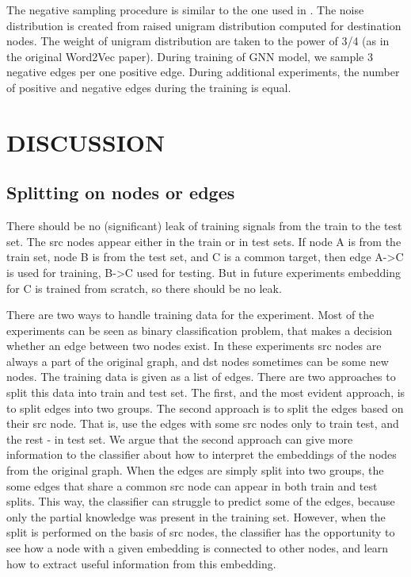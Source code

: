 \documentclass[a4paper,twoside]{article}
\begin{document}
The negative sampling procedure is similar to the one used in \cite{mikolov2013distributed}. The noise distribution is created from raised unigram distribution computed for destination nodes. The weight of unigram distribution are taken to the power of 3/4 (as in the original Word2Vec paper). During training of GNN model, we sample 3 negative edges per one positive edge. During additional experiments, the number of positive and negative edges during the training is equal.


\section{\uppercase{Discussion}}

\subsection{Splitting on nodes or edges}

There should be no (significant) leak of training signals from the train to the test set. The src nodes appear either in the train or in test sets. If node A is from the train set, node B is from the test set, and C is a common target, then edge A->C is used for training, B->C used for testing. But in future experiments embedding for C is trained from scratch, so there should be no leak.

There are two ways to handle training data for the experiment. Most of the experiments can be seen as binary classification problem, that makes a decision whether an edge between two nodes exist. In these experiments src nodes are always a part of the original graph, and dst nodes sometimes can be some new nodes. The training data is given as a list of edges. There are two approaches to split this data into train and test set. The first, and the most evident approach, is to split edges into two groups. The second approach is to split the edges based on their src node. That is, use the edges with some src nodes only to train test, and the rest - in test set. 
We argue that the second approach can give more information to the classifier about how to interpret the embeddings of the nodes from the original graph. When the edges are simply split into two groups, the some edges that share a common src node can appear in both train and test splits. This way, the classifier can struggle to predict some of the edges, because only the partial knowledge was present in the training set. However, when the split is performed on the basis of src nodes, the classifier has the opportunity to see how a node with a given embedding is connected to other nodes, and learn how to extract useful information from this embedding. 
\end{document}
